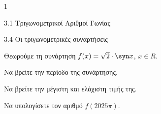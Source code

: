 \begin{ylh}{1}
\item 3.1 Τριγωνομετρικοί Αριθμοί Γωνίας
\item 3.4 Οι τριγωνομετρικές συναρτήσεις
\end{ylh}
Θεωρούμε τη συνάρτηση $f(x) = \sqrt{2} \cdot \syn  x$, $x \in R$.
\begin{alist}
\item
\begin{alist}
\item
  Να βρείτε την περίοδο της συνάρτησης.
\item
  Να βρείτε την μέγιστη και ελάχιστη τιμής της.
\item Να υπολογίσετε τον αριθμό $f(2025\pi)$.
\end{alist}
\end{alist}

